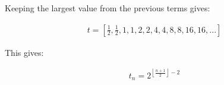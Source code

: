 \documentclass{article}
\begin{document}
\noindent
Keeping the largest value from the previous terms gives:

\begin{displaymath}\begin{aligned}
t = \left[ \frac{1}{2}, \frac{1}{2}, 1, 1, 2, 2, 4, 4, 8, 8, 16, 16, ... \right]
\end{aligned}\end{displaymath}

\noindent
This gives:

\begin{displaymath}\begin{aligned}
t_n
=
2^{\left\lfloor \frac{n+1}{2} \right\rfloor-2}
\end{aligned}\end{displaymath}
\end{document}
